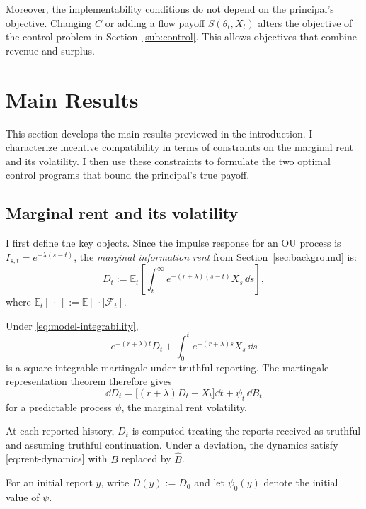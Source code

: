 \documentclass[12pt]{article}
\newcommand{\E}{\mathbb{E}}
\newcommand{\hB}{\hat B}
\begin{document}
Moreover, the implementability conditions do not depend on the
principal's objective. Changing \(C\) or adding a flow payoff
\(S(\theta_t,X_t)\) alters the objective of the control problem
in Section~\ref{sub:control}. This allows objectives that combine
revenue and surplus.

\section{Main Results}\label{sec:main_results}

This section develops the main results previewed in the introduction. I characterize incentive compatibility in terms of constraints on the marginal rent and its volatility. I then use these constraints to formulate the
two optimal control programs that bound the principal's true payoff. 

\subsection{Marginal rent and its volatility}
I first define the key objects. Since the impulse response for an OU process is \(I_{s,t} = e^{-\lambda(s-t)}\), the
\emph{marginal information rent} from Section~\ref{sec:background}
is:
\begin{equation}\label{eq:rent-process}
  D_t
  :=
  \E_t\left[
    \int_t^\infty
      e^{-(r+\lambda)(s-t)}X_s\,\dd s
  \right],
\end{equation}
where \(\E_t[\,\cdot\,]:=\E[\,\cdot\mid\mathcal F_t]\).

Under \eqref{eq:model-integrability},
\[
  e^{-(r+\lambda)t}D_t
  +
  \int_0^t e^{-(r+\lambda)s}X_s\,\dd s
\]
is a square-integrable martingale under truthful reporting. The martingale representation
theorem therefore gives
\begin{equation}\label{eq:rent-dynamics}
  \dd D_t
  =
  \bigl[(r+\lambda)D_t-X_t\bigr]\dd t
  +\psi_t\,\dd B_t
\end{equation}
for a predictable process \(\psi\), the marginal rent volatility.

At each reported history, \(D_t\) is computed treating the reports
received as truthful and assuming truthful continuation.
Under a deviation, the 
dynamics satisfy \eqref{eq:rent-dynamics} with \(B\) replaced
by \(\hB\).

For an initial report \(y\), write \(D(y):=D_0\) and let
\(\psi_0(y)\) denote the initial value of \(\psi\).
\end{document}
